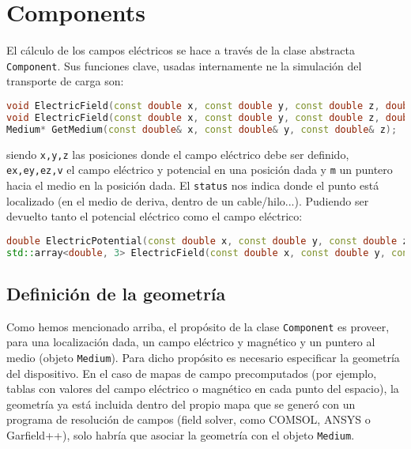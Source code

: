 \section{Components}

El cálculo de los campos eléctricos se hace a través de la clase abstracta \texttt{Component}. Sus funciones clave, usadas internamente ne la simulación del transporte de carga son:\\

\begin{lstlisting}[language=C++,style=c++]
void ElectricField(const double x, const double y, const double z, double& ex, double& ey, double& ez, Medium*& m, int& status);
void ElectricField(const double x, const double y, const double z, double& ex, double& ey, double& ez, double& v);
Medium* GetMedium(const double& x, const double& y, const double& z);
\end{lstlisting}
\vspace*{0.7em}
siendo \texttt{x,y,z} las posiciones donde el campo eléctrico debe ser definido, \texttt{ex,ey,ez,v} el campo eléctrico y potencial en una posición dada y \texttt{m} un puntero hacia el medio en la posición dada. El \texttt{status} nos indica donde el punto está localizado (en el medio de deriva, dentro de un cable/hilo...). 
Pudiendo ser devuelto tanto el potencial eléctrico como el campo eléctrico: \\

\begin{lstlisting}[language=C++,style=c++]
double ElectricPotential(const double x, const double y, const double z);
std::array<double, 3> ElectricField(const double x, const double y, const double z);
\end{lstlisting}
\vspace*{0.7em}

\subsection{Definición de la geometría}

Como hemos mencionado arriba, el propósito de la clase \texttt{Component} es proveer, para una localización dada, un campo eléctrico y magnético y un puntero al medio (objeto \texttt{Medium}). Para dicho propósito es necesario especificar la geometría del dispositivo. En el caso de mapas de campo precomputados (por ejemplo, tablas con valores del campo eléctrico o magnético en cada punto del espacio), la geometría ya está incluida dentro del propio mapa que se generó con un programa de resolución de campos (field solver, como COMSOL, ANSYS o Garfield++), solo habría que asociar la geometría con el objeto \texttt{Medium}.


